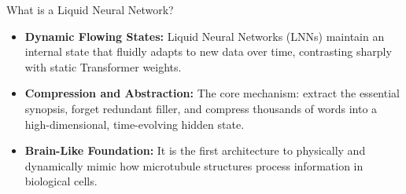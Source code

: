 ﻿\documentclass[aspectratio=169, 10pt]{beamer}
\begin{document}
\begin{frame}{What is a Liquid Neural Network?}
\begin{itemize}
    \item \textbf{Dynamic Flowing States:} Liquid Neural Networks (LNNs) maintain an internal state that fluidly adapts to new data over time, contrasting sharply with static Transformer weights.
    \item \textbf{Compression and Abstraction:} The core mechanism: extract the essential synopsis, forget redundant filler, and compress thousands of words into a high-dimensional, time-evolving hidden state.
    \item \textbf{Brain-Like Foundation:} It is the first architecture to physically and dynamically mimic how microtubule structures process information in biological cells.
\end{itemize}
\end{frame}
\end{document}
